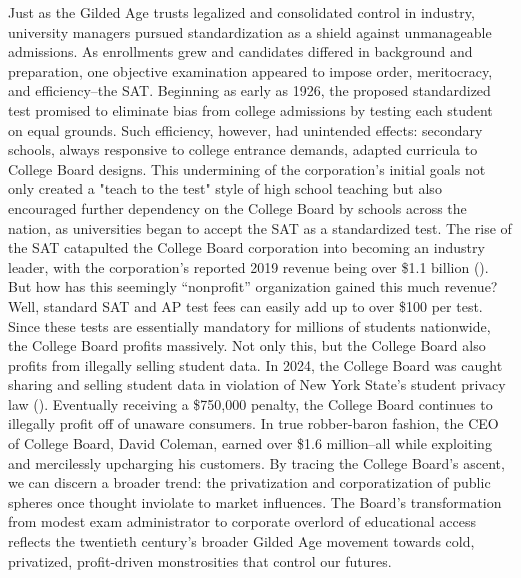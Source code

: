 Just as the Gilded Age trusts legalized and consolidated control in industry, university managers pursued standardization as a shield against unmanageable admissions. As enrollments grew and candidates differed in background and preparation, one objective examination appeared to impose order, meritocracy, and efficiency–the SAT. Beginning as early as 1926, the proposed standardized test promised to eliminate bias from college admissions by testing each student on equal grounds. Such efficiency, however, had unintended effects: secondary schools, always responsive to college entrance demands, adapted curricula to College Board designs. This undermining of the corporation's initial goals not only created a "teach to the test" style of high school teaching but also encouraged further dependency on the College Board by schools across the nation, as universities began to accept the SAT as a standardized test. The rise of the SAT catapulted the College Board corporation into becoming an industry leader, with the corporation’s reported 2019 revenue being over \$1.1 billion (\cite{totalregistration}). But how has this seemingly “nonprofit” organization gained this much revenue? Well, standard SAT and AP test fees can easily add up to over \$100 per test. Since these tests are essentially mandatory for millions of students nationwide, the College Board profits massively. Not only this, but the College Board also profits from illegally selling student data. In 2024, the College Board was caught sharing and selling student data in violation of New York State’s student privacy law (\cite{desantis2024}). Eventually receiving a \$750,000 penalty, the College Board continues to illegally profit off of unaware consumers. In true robber-baron fashion, the CEO of College Board, David Coleman, earned over \$1.6 million–all while exploiting and mercilessly upcharging his customers. By tracing the College Board's ascent, we can discern a broader trend: the privatization and corporatization of public spheres once thought inviolate to market influences. The Board's transformation from modest exam administrator to corporate overlord of educational access reflects the twentieth century's broader Gilded Age movement towards cold, privatized, profit-driven monstrosities that control our futures.

